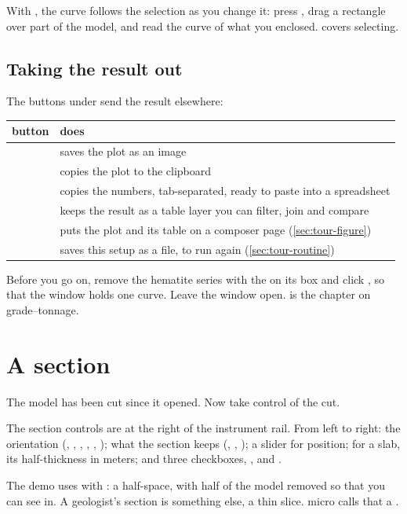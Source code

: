With , the curve follows the selection as you change it: press , drag a rectangle over part of the model, and read the curve of what you enclosed.  covers selecting.

\subsection{Taking the result out}
The buttons under  send the result elsewhere:

\begin{tabularx}{\linewidth}{@{}lL@{}}\toprule
button & does \\ \midrule
{} & saves the plot as an image \\
 & copies the plot to the clipboard \\
 & copies the numbers, tab-separated, ready to paste into a spreadsheet \\
 & keeps the result as a table layer you can filter, join and compare \\
 & puts the plot and its table on a composer page (\cref{sec:tour-figure}) \\
 & saves this setup as a file, to run again (\cref{sec:tour-routine}) \\
\bottomrule
\end{tabularx}

Before you go on, remove the hematite series with the  on its box and click , so that the window holds one curve. Leave the window open.  is the chapter on grade–tonnage.

\section{A section}\label{sec:tour-section}
The model has been cut since it opened. Now take control of the cut.

The section controls are at the right of the instrument rail. From left to right: the orientation (, , , , , ); what the section keeps (, , ); a slider for position; for a slab, its half-thickness in meters; and three checkboxes, ,  and .

The demo uses  with : a half-space, with half of the model removed so that you can see in. A geologist's section is something else, a thin slice. micro calls that a .

